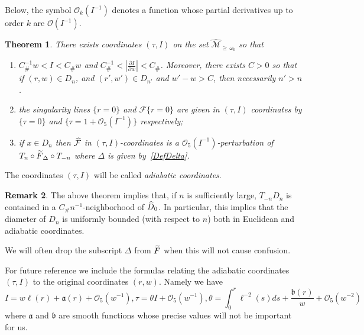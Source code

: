 \documentclass[10pt]{amsart}
\newtheorem{theo}{Theorem}[section]
\theoremstyle{definition}\newtheorem{defi}[theo]{Definition}\newtheorem{rema}[theo]{Remark}\newtheorem{exam}[theo]{Example}\newtheorem{exem}[theo]{Example}\newtheorem{nota}[theo]{Notation}
\newcommand{\ct}{r}
\newcommand{\const}{C_\#}
\newcommand{\inv}{^{-1}}
\newcommand{\fka}{\mathfrak{a}}
\newcommand{\fkb}{\mathfrak{b}}
\newcommand{\cO}{\mathcal{O}}
\newcommand{\cm}{\mathcal{F}}
\newcommand{\csp}{\mathcal{M}}
\newcommand{\cmp}{\hat\cm}
\newcommand{\cspil}[1]{\widehat{\csp}_{\ge\,#1}}
\newcommand{\law}[1]{\omega_{#1}}
\newcommand{\Dom}{D}
\newcommand{\hDom}{\hat D}
\newcommand{\nfr}{\tilde F}
\newcommand{\tsl}[1]{T_{#1}}
\newcommand*{\relabel}{\renewcommand{\labelenumi}{(\theenumi)}}
\newcommand*{\alphenumi}{\renewcommand*{\theenumi}{\alph{enumi}}\relabel}
\let\oldtilde\tilde
\renewcommand*{\tilde}[1]{\mathchoice{\widetilde{#1}}{\widetilde{#1}}{\oldtilde{#1}}{\oldtilde{#1}}}
\let\oldhat\hat
\renewcommand*{\hat}[1]{\mathchoice{\widehat{#1}}{\widehat{#1}}{\oldhat{#1}}{\oldhat{#1}}}
\begin{document}
Below, the symbol $\cO_k(I^{-1})$ denotes a function whose partial derivatives up to order $k$ are $\cO(I^{-1})$.
\begin{theo}\label{t_normalForm}
There exists coordinates $(\tau,I)$ on the set $\cspil{\law0}$ so that
\begin{enumerate}\alphenumi
\item\label{theo4.9.1} $\const\inv w < I < \const w$ and $\const\inv < |\frac{\partial I}{\partial w}| < \const$. Moreover, there exists $C > 0$ so that if $(r,w)\in D_n$, and $(r',w')\in D_{n'}$ and $w' -w > C$, then necessarily $n' > n$.
\item\label{theo4.9.2} the singularity lines $\{\ct = 0\}$ and $\cm \{\ct = 0\}$ are given in $(\tau, I)$ coordinates by $\{\tau = 0\}$ and $\{\tau = 1+\cO_5\left(I^{-1}\right)\}$ respectively;
\item\label{theo4.9.3} if $x\in D_n$ then $\cmp$ in $(\tau,I)$-coordinates is a $\cO_5(I\inv)$-perturbation of $\tsl n\circ\nfr_\Delta\circ\tsl {-n}$ where $\Delta$ is given by~\eqref{DefDelta}.
\end{enumerate}
\end{theo} The coordinates $(\tau, I)$ will be called \emph{adiabatic coordinates}.


\begin{rema}\label{remark_diam-domain}
The above theorem implies that, if $n$ is sufficiently large, $\tsl{-n}\Dom_n$ is contained in a $\const n\inv$-neighborhood of $\hDom_0$. In particular, this implies that the diameter of $\Dom_{n}$ is uniformly bounded (with respect to $n$) both in Euclidean and adiabatic coordinates.
\end{rema}

We will often drop the subscript $\Delta$ from $\nfr$ when this will not cause confusion.

For future reference we include the formulas relating the adiabatic coordinates $(\tau, I)$ to the original coordinates $(\ct, w).$ Namely we have
\begin{subequations}\label{ChCoordIT}
\begin{equation}
I=w \ell(\ct) +\fka(\ct)+\cO_5(w^{-1}),
\end{equation}
\begin{equation}
\tau= \theta I+\cO_5(w^{-1}),
\end{equation}
\begin{equation}
\theta=\int_0^r \ell^{-2}(s)
ds+\frac{\fkb(\ct)}{w}+\cO_5(w^{-2})
\end{equation}
\end{subequations}
where $\fka$ and $\fkb$ are smooth functions whose precise values will not be important for us.
\end{document}
